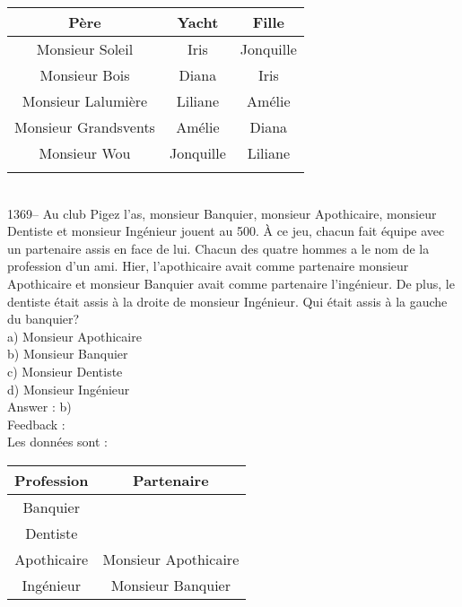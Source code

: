 ﻿\documentclass[letterpaper, 12pt]{article}
\begin{document}
\begin{tabular}{|c|c|c|} \hline
{\bf P\`ere} & {\bf Yacht} & {\bf Fille}  \\ \hline \hline

Monsieur Soleil        & Iris      &  Jonquille \\ \hline Monsieur
Bois          & Diana     &  Iris      \\ \hline Monsieur
Lalumi\`ere & Liliane   &  Am\'elie  \\ \hline Monsieur Grandsvents
& Am\'elie
&  Diana     \\ \hline Monsieur Wou & Jonquille &  Liliane   \\
\hline
\multicolumn{3}{c}{}\\
\end{tabular}\\


1369-- Au club \og Pigez l'as\fg , monsieur Banquier, monsieur
Apothicaire, monsieur Dentiste et monsieur Ing\'enieur jouent \og au
500\fg.  \`A ce jeu, chacun fait \'equipe avec un partenaire assis
en face de lui.  Chacun des quatre hommes a le nom de la profession
d'un ami.  Hier, l'apothicaire avait comme partenaire monsieur
Apothicaire et monsieur Banquier avait comme partenaire
l'ing\'enieur.  De plus, le dentiste \'etait assis \`a la droite
de monsieur Ing\'enieur.  Qui \'etait assis \`a la gauche du banquier?\\
a) Monsieur Apothicaire\\
b) Monsieur Banquier\\
c) Monsieur Dentiste\\
d) Monsieur Ing\'enieur\\

Answer : b)\\

Feedback : \\
Les donn\'ees sont : \\
\begin{tabular}{|c|c|} \hline
{\bf Profession} & {\bf Partenaire}    \\ \hline \hline

Banquier      &                       \\ \hline Dentiste      &
\\ \hline Apothicaire   & Monsieur Apothicaire  \\ \hline
Ing\'enieur   & Monsieur Banquier     \\ \hline
\end{tabular}\\
\end{document}
